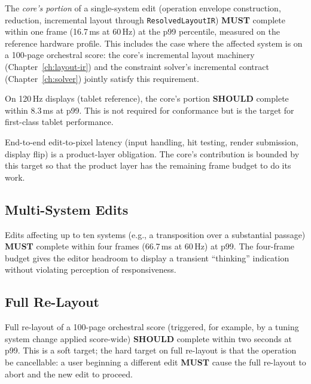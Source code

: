 \documentclass[11pt,letterpaper]{report}
\newcounter{requirement}[chapter]
\newcommand{\MUST}{\textbf{MUST}}
\newcommand{\SHOULD}{\textbf{SHOULD}}
\begin{document}
\begin{requirement}
  \label{req:perf:single-system-edit-latency}
  The \emph{core's portion} of a single-system edit (operation
  envelope construction, reduction, incremental layout through
  \texttt{ResolvedLayoutIR}) \MUST{} complete within one frame
  (16.7\,ms at 60\,Hz) at the p99 percentile, measured on the
  reference hardware profile. This includes the case where the
  affected system is on a 100-page orchestral score: the core's
  incremental layout machinery (Chapter~\ref{ch:layout-ir}) and
  the constraint solver's incremental contract
  (Chapter~\ref{ch:solver}) jointly satisfy this requirement.

  On 120\,Hz displays (tablet reference), the core's portion
  \SHOULD{} complete within 8.3\,ms at p99. This is not required
  for conformance but is the target for first-class tablet
  performance.

  End-to-end edit-to-pixel latency (input handling, hit testing,
  render submission, display flip) is a product-layer obligation.
  The core's contribution is bounded by this target so that the
  product layer has the remaining frame budget to do its work.
\end{requirement}

\subsection{Multi-System Edits}

\begin{requirement}
  \label{req:perf:multi-system-edit-latency}
  Edits affecting up to ten systems (e.g., a transposition over
  a substantial passage) \MUST{} complete within four frames
  (66.7\,ms at 60\,Hz) at p99. The four-frame budget gives the
  editor headroom to display a transient ``thinking'' indication
  without violating perception of responsiveness.
\end{requirement}

\subsection{Full Re-Layout}

\begin{requirement}
  \label{req:perf:full-relayout-latency}
  Full re-layout of a 100-page orchestral score (triggered, for
  example, by a tuning system change applied score-wide) \SHOULD{}
  complete within two seconds at p99. This is a soft target; the
  hard target on full re-layout is that the operation be
  cancellable: a user beginning a different edit \MUST{} cause the
  full re-layout to abort and the new edit to proceed.
\end{requirement}
\end{document}
